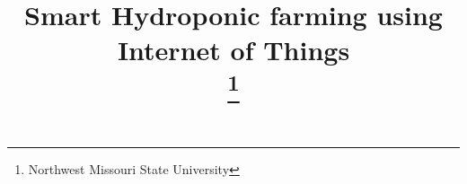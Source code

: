\documentclass[conference]{IEEEtran}
\begin{document}
\title{ \vspace{0.25in}
	Smart Hydroponic farming using Internet of Things
  \\
\thanks{Northwest Missouri State University}
}
\author{}

%





\maketitle

\begin{IEEEkeywords}

\end{IEEEkeywords}





%
%
%
%


\end{document}
